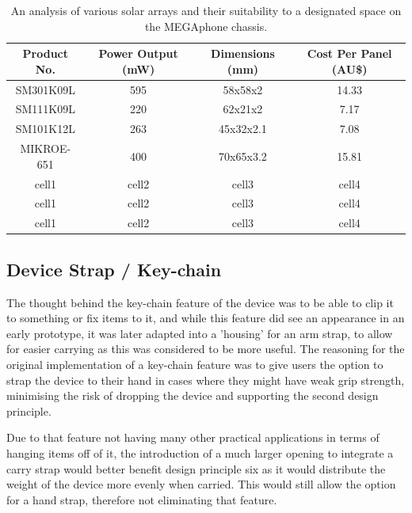 \begin{table}
    \begin{center}
        \begin{tabular}{ |c|c|c|c| }
        \hline
        Product No. & Power Output (mW) & Dimensions (mm) & Cost Per Panel (AU\$) \\
        \hline
        SM301K09L & 595 & 58x58x2 & 14.33 \\ %
        \hline
        SM111K09L & 220 & 62x21x2 & 7.17 \\ 
        \hline
        SM101K12L & 263 & 45x32x2.1 & 7.08 \\
        \hline
        MIKROE-651 & 400 & 70x65x3.2 & 15.81 \\
        \hline
        cell1 & cell2 & cell3 & cell4 \\
        \hline
        cell1 & cell2 & cell3 & cell4 \\
        \hline
        cell1 & cell2 & cell3 & cell4 \\
        \hline
        \end{tabular}
    \end{center}
    \caption{An analysis of various solar arrays and their suitability to a designated space on the MEGAphone chassis.}
    \label{fig:SolarTable}
\end{table}


\subsection{Device Strap / Key-chain}

The thought behind the key-chain feature of the device was to be able to clip it to something or fix items to it, and while this feature did see an appearance in an early prototype, it was later adapted into a 'housing' for an arm strap, to allow for easier carrying as this was considered to be more useful.
The reasoning for the original implementation of a key-chain feature was to give users the option to strap the device to their hand in cases where they might have weak grip strength, minimising the risk of dropping the device and supporting the second design principle.

Due to that feature not having many other practical applications in terms of hanging items off of it, the introduction of a much larger opening to integrate a carry strap would better benefit design principle six as it would distribute the weight of the device more evenly when carried.
This would still allow the option for a hand strap, therefore not eliminating that feature.
 
